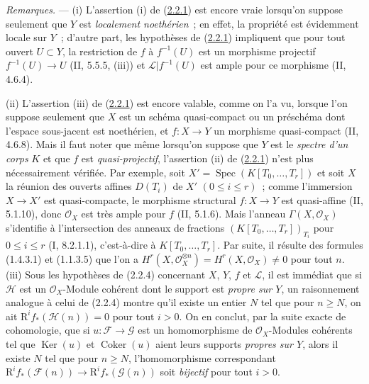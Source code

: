 \begin{env}[2.2.5]
\label{III.2.2.5-fr}
\emph{Remarques.} ---
(i) L'assertion (i) de (\hyperref[III.2.2.1-fr]{2.2.1}) est encore vraie
lorsqu'on suppose seulement que $Y$ est \emph{localement noethérien}~; en
effet, la propriété est évidemment locale sur $Y$~; d'autre part, les
hypothèses de (\hyperref[III.2.2.1-fr]{2.2.1}) impliquent que pour tout
ouvert $U\subset Y$, la restriction de $f$ à $f^{-1}(U)$ est un morphisme
projectif $f^{-1}(U)\to U$ (II, 5.5.5, (iii)) et
$\mathcal L|f^{-1}(U)$ est ample pour ce morphisme (II, 4.6.4).

(ii) L'assertion (iii) de (\hyperref[III.2.2.1-fr]{2.2.1}) est encore
valable, comme on l'a vu, lorsque l'on suppose seulement que $X$ est un
schéma quasi-compact ou un préschéma dont l'espace sous-jacent est
noethérien, et $f:X\to Y$ un morphisme quasi-compact (II, 4.6.8). Mais il
faut noter que même lorsqu'on suppose que $Y$ est le \emph{spectre d'un
corps} $K$ et que $f$ est \emph{quasi-projectif}, l'assertion (ii) de
(\hyperref[III.2.2.1-fr]{2.2.1}) n'est plus nécessairement vérifiée. Par
exemple, soit $X'=\operatorname{Spec}(K[T_0,\ldots,T_r])$ et soit $X$ la
réunion des ouverts affines $D(T_i)$ de $X'$ $(0\leq i\leq r)$~; comme
l'immersion $X\to X'$ est quasi-compacte, le morphisme structural
$f:X\to Y$ est quasi-affine (II, 5.1.10), donc $\mathcal O_X$ est très
ample pour $f$ (II, 5.1.6). Mais l'anneau
$\Gamma(X,\mathcal O_X)$ s'identifie à l'intersection des anneaux de
fractions $(K[T_0,\ldots,T_r])_{T_i}$ pour $0\leq i\leq r$
(I, 8.2.1.1), c'est-à-dire à $K[T_0,\ldots,T_r]$. Par suite, il résulte
des formules (1.4.3.1) et (1.1.3.5) que l'on a
$H^r(X,\mathcal O_X^{\otimes n})=H^r(X,\mathcal O_X)\neq0$ pour tout
$n$.
(iii) Sous les hypothèses de (2.2.4) concernant $X$, $Y$, $f$ et $\mathcal L$,
il est immédiat que si $\mathcal H$ est un $\mathcal O_X$-Module cohérent dont
le support est \emph{propre sur $Y$}, un raisonnement analogue à celui de
(2.2.4) montre qu'il existe un entier $N$ tel que pour $n\geq N$, on ait
$\mathrm R^if_*(\mathcal H(n))=0$ pour tout $i>0$. On en conclut, par la suite
exacte de cohomologie, que si $u:\mathcal F\to\mathcal G$ est un homomorphisme
de $\mathcal O_X$-Modules cohérents tel que $\operatorname{Ker}(u)$ et
$\operatorname{Coker}(u)$ aient leurs supports \emph{propres sur $Y$}, alors il
existe $N$ tel que pour $n\geq N$, l'homomorphisme correspondant
$\mathrm R^if_*(\mathcal F(n))\to\mathrm R^if_*(\mathcal G(n))$ soit
\emph{bijectif} pour tout $i>0$.
\end{env}

